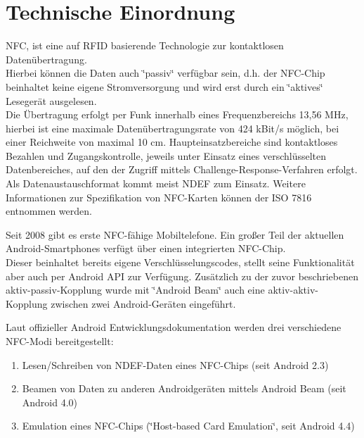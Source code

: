 \documentclass[a4paper,ngerman,12pt]{scrreprt}
\newcommand{\+}{\discretionary{\mbox{\scriptsize$\hookleftarrow$}}{}{}}
\begin{document}
\chapter{Technische Einordnung}

\ac{NFC}, ist eine auf \ac{RFID} basierende Technologie zur kontaktlosen Datenübertragung. \\
Hierbei können die Daten auch \char`\"{}passiv\char`\"{} verfügbar sein, d.\+h. der N\+F\+C-\/\+Chip beinhaltet keine eigene Stromversorgung und wird erst durch ein \char`\"{}aktives\char`\"{} Lesegerät ausgelesen. \\
Die Übertragung erfolgt per Funk innerhalb eines Frequenzbereichs 13,56 M\+Hz, hierbei ist eine maximale Datenübertragungsrate von 424 k\+Bit/s möglich, bei einer Reichweite von maximal 10 cm. 
Haupteinsatzbereiche sind kontaktloses Bezahlen und Zugangskontrolle, jeweils unter Einsatz eines verschlüsselten Datenbereiches, auf den der Zugriff mittels Challenge-\/\+Response-\/\+Verfahren erfolgt. \\
Als Datenaustauschformat kommt meist \ac{NDEF} zum Einsatz. Weitere Informationen zur Spezifikation von N\+F\+C-\/\+Karten können der I\+SO 7816 entnommen werden.\newline

Seit 2008 gibt es erste N\+F\+C-\/fähige Mobiltelefone. Ein großer Teil der aktuellen Android-Smartphones verfügt über einen integrierten N\+F\+C-\/\+Chip. \\
Dieser beinhaltet bereits eigene Verschlüsselungscodes, stellt seine Funktionalität aber auch per Android A\+PI zur Verfügung. Zusätzlich zu der zuvor beschriebenen aktiv-\/passiv-\/\+Kopplung wurde mit \char`\"{}\+Android Beam\char`\"{} auch eine aktiv-\/aktiv-\/\+Kopplung zwischen zwei Android-\/\+Geräten eingeführt.

Laut offizieller Android Entwicklungsdokumentation werden drei verschiedene N\+F\+C-\/\+Modi bereitgestellt:


\begin{enumerate}[-]
\item Lesen/\+Schreiben von N\+D\+E\+F-\/\+Daten eines N\+F\+C-\/\+Chips (seit Android 2.\+3)
\item Beamen von Daten zu anderen Androidgeräten mittels Android Beam (seit Android 4.\+0)
\item Emulation eines N\+F\+C-\/\+Chips (\char`\"{}\+Host-\/based Card Emulation\char`\"{}, seit Android 4.\+4)
\end{enumerate}
\end{document}
